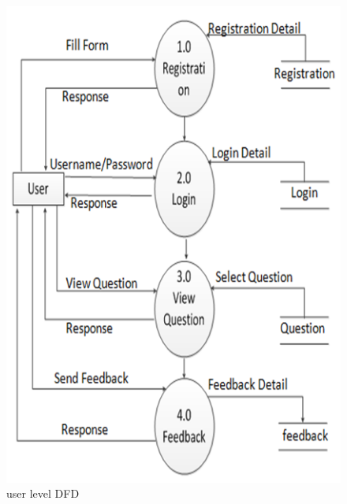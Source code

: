 \begin{figure}[h]
	\label{ss}    %
	\centering

	\includegraphics[width= 11 cm]{user.png}
	\caption{user level DFD}
\end{figure}
\newpage
